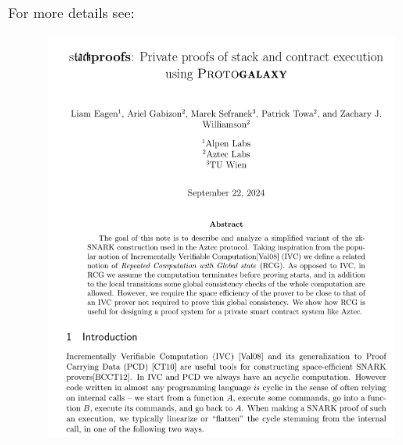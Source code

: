\documentclass[shadesubsections,compress,14pt,mathserif]{beamer}
\begin{document}
\begin{frame}

 For more details see:
 \begin{figure}
  \includegraphics[width=260pt]{stackproofs.png}
\end{figure}
\end{frame}
% 
\end{document}
